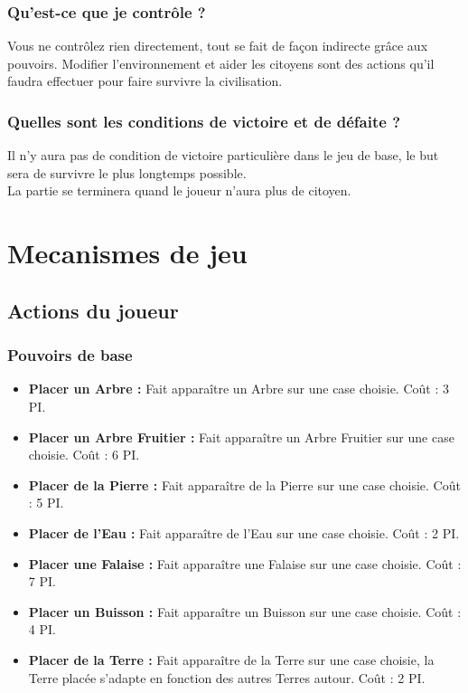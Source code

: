 \documentclass[a4paper]{article}
\newcommand{\alinea}{\hspace*{0.5cm}}
\begin{document}
        \subsubsection{Qu'est-ce que je contrôle ?}
          \alinea Vous ne contrôlez rien directement, tout se fait de façon indirecte grâce aux pouvoirs. Modifier l'environnement et aider les citoyens sont des actions qu'il faudra effectuer pour faire survivre la civilisation.
    
        \subsubsection{Quelles sont les conditions de victoire et de défaite ?}
          \alinea Il n'y aura pas de condition de victoire particulière dans le jeu de base, le but sera de survivre le plus longtemps possible.\\
          La partie se terminera quand le joueur n'aura plus de citoyen.
		  
    \section{Mecanismes de jeu}


	  \subsection{Actions du joueur}
        \subsubsection{Pouvoirs de base}
          \begin{itemize} \small
            \item \textbf{Placer un Arbre :} Fait apparaître un Arbre sur une case choisie. Coût : 3 PI.
            \item \textbf{Placer un Arbre Fruitier :} Fait apparaître un Arbre Fruitier sur une case choisie. Coût : 6 PI.
            \item \textbf{Placer de la Pierre :} Fait apparaître de la Pierre sur une case choisie. Coût : 5 PI.
            \item \textbf{Placer de l'Eau :} Fait apparaître de l'Eau sur une case choisie. Coût : 2 PI.
            \item \textbf{Placer une Falaise :} Fait apparaître une Falaise sur une case choisie. Coût : 7 PI.
            \item \textbf{Placer un Buisson :} Fait apparaître un Buisson sur une case choisie. Coût : 4 PI.
            \item \textbf{Placer de la Terre :} Fait apparaître de la Terre sur une case choisie, la Terre placée s'adapte en fonction des autres Terres autour. Coût : 2 PI.
          \end{itemize} \normalsize
\end{document}
